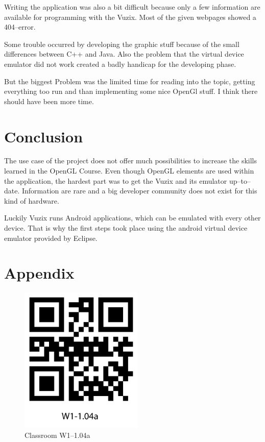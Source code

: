 \documentclass[11pt]{scrartcl}
\begin{document}
\begin{multicols}{2}
			Writing the application was also a bit difficult because only a few information are available for programming with the Vuzix. Most of the given webpages showed a 404--error.
			 
			 Some trouble occurred by developing the graphic stuff because of the small differences between C++ and Java. Also the problem that the virtual device emulator did not work created a badly handicap for the developing phase.
			 
			 But the biggest Problem was the limited time for reading into the topic, getting everything too run and than implementing some nice OpenGl stuff. I think there should have been more time.
			
	\section{Conclusion}
		The use case of the project does not offer much possibilities to increase the skills learned in the OpenGL Course. Even though OpenGL elements are used within the application, the hardest part was to get the Vuzix and its emulator up--to--date. Information are rare and a big developer community does not exist for this kind of hardware.
		
		Luckily Vuzix runs Android applications, which can be emulated with every other device. That is why the first steps took place using the android virtual device emulator provided by Eclipse.
\end{multicols}




\pagebreak
\section*{Appendix}
	\begin{figure}[htpb]
		\centering
		\includegraphics[height=7cm]{figure/qrcode_W1-104a}
		\caption{Classroom W1--1.04a\label{qrCodeW1-1.04a}}
	\end{figure}
	
\end{document}
